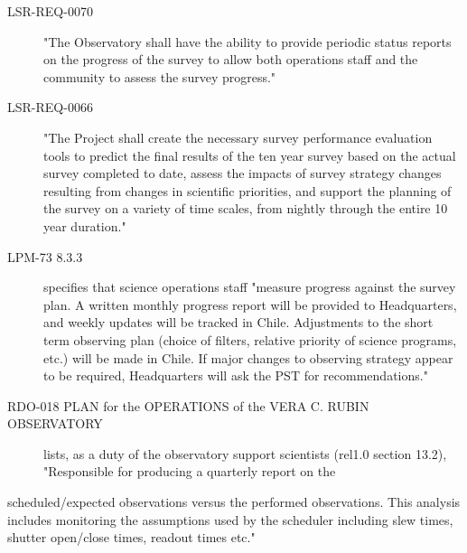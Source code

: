\begin{description}
\begin{description}
\item[{LSR-REQ-0070}] "The Observatory shall have the ability to provide periodic status reports on the progress of the survey to allow both operations staff and the community to assess the survey progress."
\item[{LSR-REQ-0066}] "The Project shall create the necessary survey performance evaluation tools to predict the final results of the ten year survey based on the actual survey completed to date, assess the impacts of survey strategy changes resulting from changes in scientific priorities, and support the planning of the survey on a variety of time scales, from nightly through the entire 10 year duration."
\item[{LPM-73 8.3.3}] specifies that science operations staff "measure progress against the survey plan. A written monthly progress report will be provided to Headquarters, and weekly updates will be tracked in Chile. Adjustments to the short term observing plan (choice of filters, relative priority of science programs, etc.)  will be made in Chile. If major changes to observing strategy appear to be required, Headquarters will ask the PST for recommendations."
\item[{RDO-018 PLAN for the OPERATIONS of the VERA C. RUBIN OBSERVATORY}] lists, as a duty of the observatory support scientists (rel1.0 section 13.2), "Responsible for producing a quarterly report on the
\end{description}
\end{description}
scheduled/expected observations versus the performed observations. This analysis includes monitoring the assumptions used by the scheduler including slew times, shutter open/close times, readout times etc."
